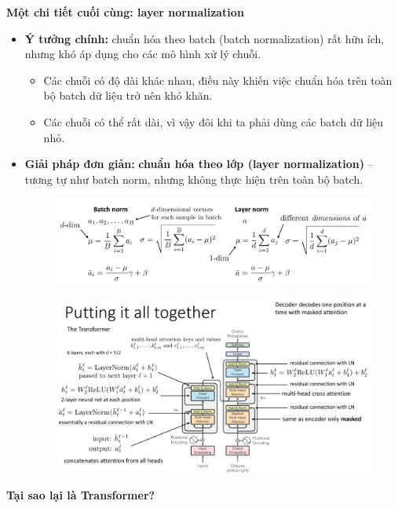 \documentclass{book}
\begin{document}
\textbf{Một chi tiết cuối cùng: layer normalization}
\begin{itemize}
    \item \textbf{Ý tưởng chính:} chuẩn hóa theo batch (batch normalization) rất hữu ích, nhưng khó áp dụng cho các mô hình xử lý chuỗi.
    \begin{itemize}
        \item Các chuỗi có độ dài khác nhau, điều này khiến việc chuẩn hóa trên toàn bộ batch dữ liệu trở nên khó khăn.
        \item Các chuỗi có thể rất dài, vì vậy đôi khi ta phải dùng các batch dữ liệu nhỏ.
    \end{itemize}
    \item \textbf{Giải pháp đơn giản:} \textbf{chuẩn hóa theo lớp (layer normalization)} – tương tự như batch norm, nhưng không thực hiện trên toàn bộ batch.
    \begin{figure}[H]
        \centering
        \includegraphics[width=1.0\linewidth]{images/recipe.png}

    \end{figure}
    \begin{figure}[H]
        \centering
        \includegraphics[width=1.0\linewidth]{images/attention_struc.png}

    \end{figure}
\end{itemize}
\textbf{Tại sao lại là Transformer?}
\end{document}
